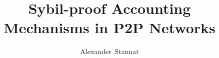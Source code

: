\documentclass[whitelogo]{tudelft-report}
\theoremstyle{definition}
\theoremstyle{theorem}
\theoremstyle{proposition}
\theoremstyle{corollary}
\theoremstyle{lemma}
\theoremstyle{example}
\theoremstyle{remark}
\begin{document}
\frontmatter


\title[tudelft-white]{Sybil-proof Accounting Mechanisms in P2P Networks}
\author[tudelft-white]{Alexander\ Stannat}
\makecover[split]






\tableofcontents

\mainmatter
















\appendix




\end{document}
